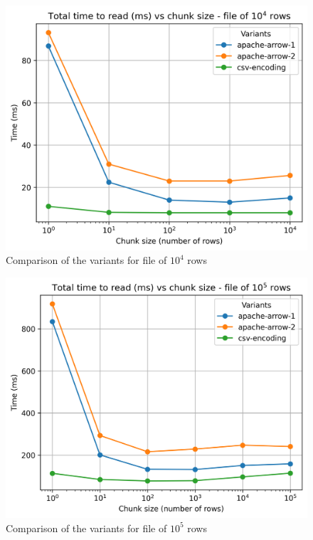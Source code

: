 \documentclass{article}
\begin{document}
\begin{figure}[H]
  \centering
  \includegraphics[scale = 0.7]{images/read-input-10-4.png}
  \caption{Comparison of the variants for file of $10^4$ rows}
\end{figure}

\begin{figure}[H]
  \centering
  \includegraphics[scale = 0.7]{images/read-input-10-5.png}
  \caption{Comparison of the variants for file of $10^5$ rows}
\end{figure}
\end{document}
